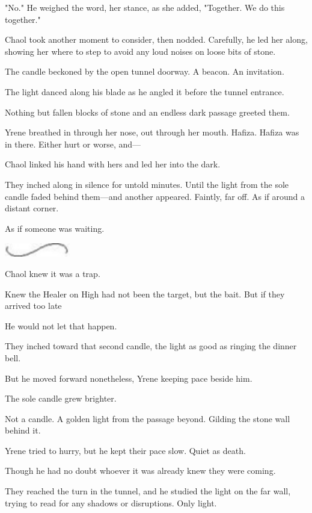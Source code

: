 "No."
He weighed the word, her stance, as she added, "Together.
We do this together."

Chaol took another moment to consider, then nodded.
Carefully, he led her along, showing her where to step to avoid any loud noises on loose bits of stone.

The candle beckoned by the open tunnel doorway.
A beacon.
An invitation.

The light danced along his blade as he angled it before the tunnel entrance.

Nothing but fallen blocks of stone and an endless dark passage greeted them.

Yrene breathed in through her nose, out through her mouth.
Hafiza.
Hafiza was in there.
Either hurt or worse, and---

Chaol linked his hand with hers and led her into the dark.

They inched along in silence for untold minutes.
Until the light from the sole candle faded behind them---and another appeared.
Faintly, far off.
As if around a distant corner.

As if someone was waiting.

\begin{center}
	\includegraphics[width=1.12in,height=0.24in]{images/seperator}
\end{center}

Chaol knew it was a trap.

Knew the Healer on High had not been the target, but the bait.
But if they arrived too late 

He would not let that happen.

They inched toward that second candle, the light as good as ringing the dinner bell.

But he moved forward nonetheless, Yrene keeping pace beside him.

The sole candle grew brighter.

Not a candle.
A golden light from the passage beyond.
Gilding the stone wall behind it.

Yrene tried to hurry, but he kept their pace slow.
Quiet as death.

Though he had no doubt whoever it was already knew they were coming.

They reached the turn in the tunnel, and he studied the light on the far wall, trying to read for any shadows or disruptions.
Only light.

